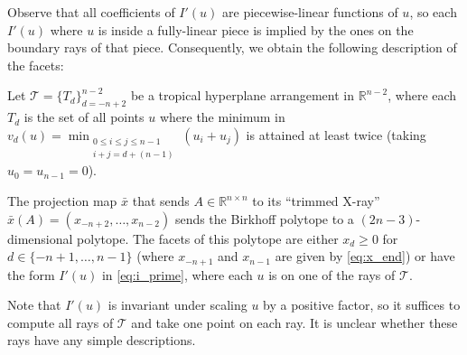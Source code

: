\documentclass[letterpaper,reqno,11pt]{amsart}
\begin{document}
Observe that all coefficients of $I'(u)$ are piecewise-linear functions of $u$, so each $I'(u)$ where $u$ is inside a fully-linear piece is implied by the ones on the boundary rays of that piece. Consequently, we obtain the following description of the facets:

\begin{proposition}\label{prop:rays}
    Let $\mathcal{T} = \{T_d\}_{d=-n+2}^{n-2}$ be a tropical hyperplane arrangement in $\mathbb{R}^{n-2}$, where each $T_d$ is the set of all points $u$ where the minimum in $v_d(u)=\min_{\substack{0\leq i\leq j\leq n-1\\ i+j=d+(n-1)}} (u_i + u_j)$ is attained at least twice (taking $u_0 = u_{n-1} = 0$).
    
    The projection map $\bar{x}$ that sends $A\in \mathbb{R}^{n\times n}$ to its ``trimmed X-ray'' $\bar{x}(A) = (x_{-n+2}, \dots, x_{n-2})$ sends the Birkhoff polytope to a $(2n-3)$-dimensional polytope. The facets of this polytope are either $x_d \geq 0$ for $d\in \{-n+1, \dots, n-1\}$ (where $x_{-n+1}$ and $x_{n-1}$ are given by \eqref{eq:x_end}) or have the form $I'(u)$ in \eqref{eq:i_prime}, where each $u$ is on one of the rays of $\mathcal{T}$.
\end{proposition}

Note that $I'(u)$ is invariant under scaling $u$ by a positive factor, so it suffices to compute all rays of $\mathcal{T}$ and take one point on each ray. It is unclear whether these rays have any simple descriptions.
\end{document}
